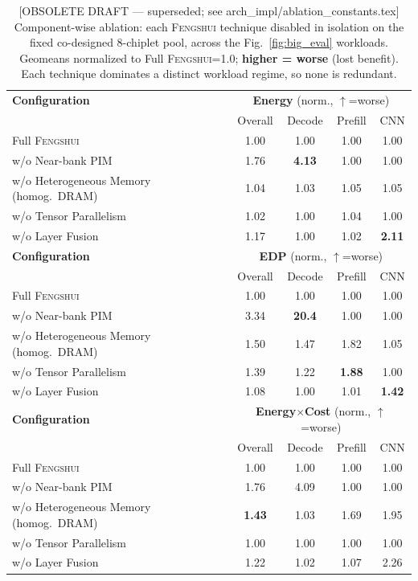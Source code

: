 \begin{table}[t]
\centering
\caption{[OBSOLETE DRAFT — superseded; see arch\_impl/ablation\_constants.tex]
Component-wise ablation: each \textsc{Fengshui} technique disabled in isolation on the
fixed co-designed 8-chiplet pool, across the Fig.~\ref{fig:big_eval} workloads. Geomeans
normalized to Full \textsc{Fengshui}=1.0; \textbf{higher = worse} (lost benefit). Each technique
dominates a distinct workload regime, so none is redundant.}
\label{tab:ablation_obsolete_do_not_use}
\small
\setlength{\tabcolsep}{4pt}
\begin{tabular}{@{}lcccc@{}}
\toprule
\textbf{Configuration} & \multicolumn{4}{c}{\textbf{Energy} (norm., $\uparrow$=worse)} \\
 & Overall & Decode & Prefill & CNN \\
\midrule
Full \textsc{Fengshui}                       & 1.00 & 1.00 & 1.00 & 1.00 \\
\;w/o Near-bank PIM                           & 1.76 & \textbf{4.13} & 1.00 & 1.00 \\
\;w/o Heterogeneous Memory (homog.\ DRAM)     & 1.04 & 1.03 & 1.05 & 1.05 \\
\;w/o Tensor Parallelism                      & 1.02 & 1.00 & 1.04 & 1.00 \\
\;w/o Layer Fusion                            & 1.17 & 1.00 & 1.02 & \textbf{2.11} \\
\midrule
\textbf{Configuration} & \multicolumn{4}{c}{\textbf{EDP} (norm., $\uparrow$=worse)} \\
 & Overall & Decode & Prefill & CNN \\
\midrule
Full \textsc{Fengshui}                       & 1.00 & 1.00 & 1.00 & 1.00 \\
\;w/o Near-bank PIM                           & 3.34 & \textbf{20.4} & 1.00 & 1.00 \\
\;w/o Heterogeneous Memory (homog.\ DRAM)     & 1.50 & 1.47 & 1.82 & 1.05 \\
\;w/o Tensor Parallelism                      & 1.39 & 1.22 & \textbf{1.88} & 1.00 \\
\;w/o Layer Fusion                            & 1.08 & 1.00 & 1.01 & \textbf{1.42} \\
\midrule
\textbf{Configuration} & \multicolumn{4}{c}{\textbf{Energy$\times$Cost} (norm., $\uparrow$=worse)} \\
 & Overall & Decode & Prefill & CNN \\
\midrule
Full \textsc{Fengshui}                       & 1.00 & 1.00 & 1.00 & 1.00 \\
\;w/o Near-bank PIM                           & 1.76 & 4.09 & 1.00 & 1.00 \\
\;w/o Heterogeneous Memory (homog.\ DRAM)     & \textbf{1.43} & 1.03 & 1.69 & 1.95 \\
\;w/o Tensor Parallelism                      & 1.00 & 1.00 & 1.00 & 1.00 \\
\;w/o Layer Fusion                            & 1.22 & 1.02 & 1.07 & 2.26 \\
\bottomrule
\end{tabular}


\end{table}
